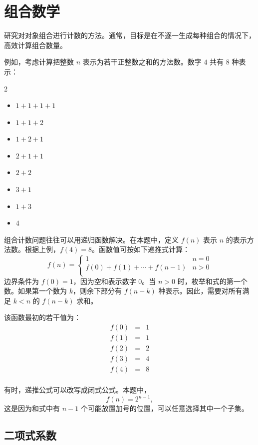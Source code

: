 \chapter{组合数学}


研究对对象组合进行计数的方法。通常，目标是在不逐一生成每种组合的情况下，高效计算组合数量。

例如，考虑计算把整数 $n$ 表示为若干正整数之和的方法数。数字 $4$ 共有 8 种表示：
\begin{multicols}{2}
\begin{itemize}
\item $1+1+1+1$
\item $1+1+2$
\item $1+2+1$
\item $2+1+1$
\item $2+2$
\item $3+1$
\item $1+3$
\item $4$
\end{itemize}
\end{multicols}

组合计数问题往往可以用递归函数解决。在本题中，定义 $f(n)$ 表示 $n$ 的表示方法数。根据上例，$f(4)=8$。函数值可按如下递推式计算：
\begin{equation*}
    f(n) = \begin{cases}
               1               & n = 0\\
               f(0)+f(1)+\cdots+f(n-1) & n > 0\\
           \end{cases}
\end{equation*}
边界条件为 $f(0)=1$，因为空和表示数字 0。当 $n>0$ 时，枚举和式的第一个数。如果第一个数为 $k$，则余下部分有 $f(n-k)$ 种表示。因此，需要对所有满足 $k<n$ 的 $f(n-k)$ 求和。

该函数最初的若干值为：
\[
\begin{array}{lcl}
f(0) & = & 1 \\
f(1) & = & 1 \\
f(2) & = & 2 \\
f(3) & = & 4 \\
f(4) & = & 8 \\
\end{array}
\]

有时，递推公式可以改写成闭式公式。本题中，
\[
f(n)=2^{n-1},
\]
这是因为和式中有 $n-1$ 个可能放置加号的位置，可以任意选择其中一个子集。

\section{二项式系数}

